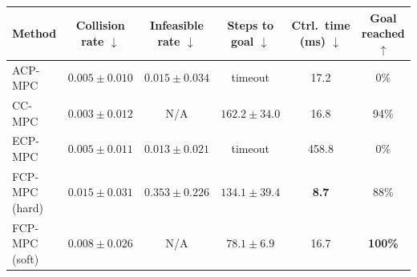 \begin{tabular}{lccccc}
\hline
Method &
Collision rate $\downarrow$ &
Infeasible rate $\downarrow$ &
Steps to goal $\downarrow$ &
Ctrl.\ time (ms) $\downarrow$ &
Goal reached $\uparrow$ \\
\hline
ACP-MPC~\cite{dixit2023adaptive}
& $0.005\pm0.010$
& $0.015\pm0.034$
& timeout
& 17.2
& 0\% \\
CC-MPC~\cite{lekeufack2024decision}
& $\mathbf{0.003}\pm0.012$
& N/A
& $162.2\pm34.0$
& 16.8
& 94\% \\
ECP-MPC~\cite{shin2025egocentric}
& $0.005\pm0.011$
& $\mathbf{0.013}\pm0.021$
& timeout
& 458.8
& 0\% \\
FCP-MPC (hard)
& $0.015\pm0.031$
& $0.353\pm0.226$
& $134.1\pm39.4$
& \textbf{8.7}
& 88\% \\
FCP-MPC (soft)
& $0.008\pm0.026$
& N/A
& $\mathbf{78.1}\pm6.9$
& 16.7
& \textbf{100\%} \\
\hline
\end{tabular}

